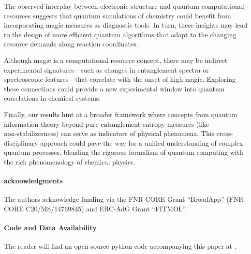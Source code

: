\documentclass[aps,prl,twocolumn,groupedaddress, reprint,floatfix,nofootinbib,longbibliography]{revtex4-2}
\newcommand{\github}[1]{\href{#1}{\faGithubSquare}}
\newcommand{\esrgithub}{\github{https://github.com/MatthieuSarkis/https://github.com/MatthieuSarkis/magic_mol}}
\begin{document}
    The observed interplay between electronic structure and quantum computational resources suggests that quantum simulations of chemistry could benefit from incorporating magic measures as diagnostic tools. In turn, these insights may lead to the design of more efficient quantum algorithms that adapt to the changing resource demands along reaction coordinates.

    Although magic is a computational resource concept, there may be indirect experimental signatures—such as changes in entanglement spectra or spectroscopic features—that correlate with the onset of high magic. Exploring these connections could provide a new experimental window into quantum correlations in chemical systems.

    Finally, our results hint at a broader framework where concepts from quantum information theory beyond pure entanglement entropy measures (like non‑stabilizerness) can serve as indicators of physical phenomena. This cross-disciplinary approach could pave the way for a unified understanding of complex quantum processes, blending the rigorous formalism of quantum computing with the rich phenomenology of chemical physics.

\vspace{1em}
\paragraph*{acknowledgments}

    The authors acknowledge funding via the FNR-CORE Grant ``BroadApp'' (FNR-CORE C20/MS/14769845) and ERC-AdG Grant ``FITMOL''.

\vspace{1em}
\paragraph*{Code and Data Availability}

    The reader will find an open source python code accompanying this paper at \esrgithub.

%
\nocite{*}

\end{document}
